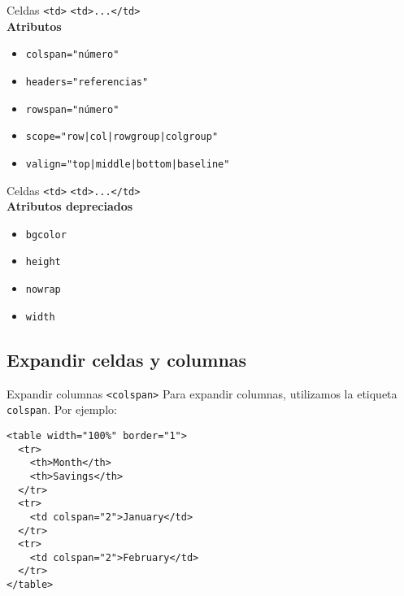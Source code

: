 \documentclass{beamer}
\begin{document}
\begin{frame}{Celdas \texttt{<td>}} %
    \texttt{<td>...</td>}\\
    \textbf{Atributos}
    {\footnotesize 
    \begin{itemize}
            \item \texttt{colspan="número"}
            \item \texttt{headers="referencias"}
            \item \texttt{rowspan="número"}
            \item \texttt{scope="row|col|rowgroup|colgroup"}
            \item \texttt{valign="top|middle|bottom|baseline"}
    \end{itemize}
    }
\end{frame}

\begin{frame}{Celdas \texttt{<td>}} %
        \texttt{<td>...</td>}\\
        \textbf{Atributos depreciados}
        \begin{itemize}
            \item \texttt{bgcolor}
            \item \texttt{height}
            \item \texttt{nowrap}
            \item \texttt{width}
        \end{itemize}
\end{frame}

\subsection{Expandir celdas y columnas} %
\label{sub:Expandir celdas y columnas}

\begin{frame}[fragile]{Expandir columnas \texttt{<colspan>} } %
        Para expandir columnas, utilizamos la etiqueta \texttt{colspan}. Por
        ejemplo: 

        \begin{lstlisting}
<table width="100%" border="1">
  <tr>
    <th>Month</th>
    <th>Savings</th>
  </tr>
  <tr>
    <td colspan="2">January</td>
  </tr>
  <tr>
    <td colspan="2">February</td>
  </tr>
</table>            
        \end{lstlisting}
\end{frame}
\end{document}
